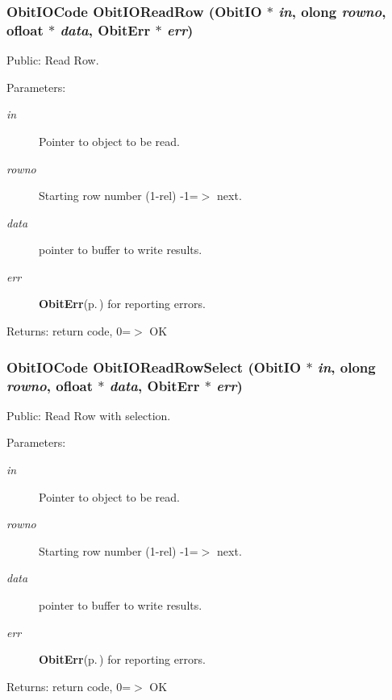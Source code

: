 \subsubsection{\setlength{\rightskip}{0pt plus 5cm}Obit\-IOCode Obit\-IORead\-Row ({\bf Obit\-IO} $\ast$ {\em in}, {\bf olong} {\em rowno}, {\bf ofloat} $\ast$ {\em data}, {\bf Obit\-Err} $\ast$ {\em err})}\label{ObitIO_8c_a18}


Public: Read Row. 

\begin{Desc}
\item[Parameters:]
\begin{description}
\item[{\em in}]Pointer to object to be read. \item[{\em rowno}]Starting row number (1-rel) -1=$>$ next. \item[{\em data}]pointer to buffer to write results. \item[{\em err}]{\bf Obit\-Err}{\rm (p.\,\pageref{structObitErr})} for reporting errors. \end{description}
\end{Desc}
\begin{Desc}
\item[Returns:]return code, 0=$>$ OK \end{Desc}
\subsubsection{\setlength{\rightskip}{0pt plus 5cm}Obit\-IOCode Obit\-IORead\-Row\-Select ({\bf Obit\-IO} $\ast$ {\em in}, {\bf olong} {\em rowno}, {\bf ofloat} $\ast$ {\em data}, {\bf Obit\-Err} $\ast$ {\em err})}\label{ObitIO_8c_a22}


Public: Read Row with selection. 

\begin{Desc}
\item[Parameters:]
\begin{description}
\item[{\em in}]Pointer to object to be read. \item[{\em rowno}]Starting row number (1-rel) -1=$>$ next. \item[{\em data}]pointer to buffer to write results. \item[{\em err}]{\bf Obit\-Err}{\rm (p.\,\pageref{structObitErr})} for reporting errors. \end{description}
\end{Desc}
\begin{Desc}
\item[Returns:]return code, 0=$>$ OK \end{Desc}
